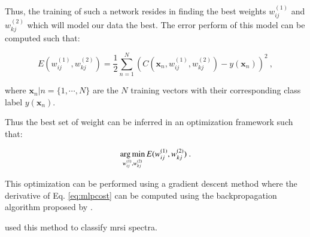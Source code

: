 \begin{enumerate}[leftmargin=*]
Thus, the training of such a network resides in finding the best weights $w_{ij}^{(1)}$ and $ w_{kj}^{(2)}$ which will model our data the best. The error perform of this model can be computed such that:

\begin{equation}
	E(w_{ij}^{(1)},w_{kj}^{(2)}) = \frac{1}{2} \sum_{n=1}^{N} \left( C(\mathbf{x}_n,w_{ij}^{(1)},w_{kj}^{(2)}) - y(\mathbf{x}_n) \right) ^{2} \ ,
	\label{eq:mlpcost}
\end{equation}

\noindent where $\mathbf{x}_n|n=\{1,\cdots,N\}$ are the $N$ training vectors with their corresponding class label $y(\mathbf{x}_n)$.

Thus the best set of weight can be inferred in an optimization framework such that:

\begin{equation}
	\operatorname*{arg\,min}_{w_{ij}^{(1)},w_{kj}^{(2)}} E(w_{ij}^{(1)},w_{kj}^{(2)}) \ . 
	\label{eq:mlpopt}
\end{equation}

This optimization can be performed using a gradient descent method where the derivative of Eq. \eqref{eq:mlpcost} can be computed using the backpropagation algorithm proposed by \cite{Rumelhart1988}.

\cite{Matulewicz2013,Parfait2012} used this method to classify \ac{mrsi} spectra.

\begin{figure}
\centering
\def\layersep{3cm}
\def\finallayersep{2.2cm}
\end{figure}
\end{enumerate}
